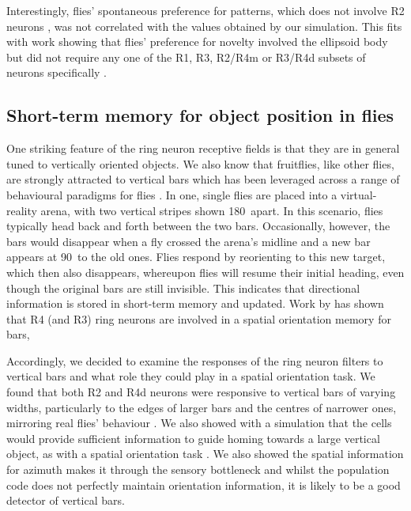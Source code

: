 Interestingly, flies' spontaneous preference for patterns, which does not involve R2 neurons \cite{Ernst1999}, was not correlated with the values obtained by our simulation. This fits with work showing that flies' preference for novelty involved the ellipsoid body but did not require any one of the R1, R3, R2/R4m or R3/R4d subsets of neurons specifically \cite{Solanki2015}.

\subsection{Short-term memory for object position in flies}

One striking feature of the ring neuron receptive fields is that they are in general tuned to vertically oriented objects.
We also know that fruitflies, like other flies, are strongly attracted to vertical bars which has been leveraged across a range of behavioural paradigms for flies \cite<bar fixation: >{Neuser2008}. In one, single flies are placed into a virtual-reality arena, with two vertical stripes shown 180\degree\ apart.
In this scenario, flies typically head back and forth between the two bars.
Occasionally, however, the bars would disappear when a fly crossed the arena's midline and a new bar appears at 90\degree\ to the old ones.
Flies respond by reorienting to this new target, which then also disappears, whereupon flies will resume their initial heading, even though the original bars are still invisible. This indicates that directional information is stored in short-term memory and updated. Work by  has shown that R4 (and R3) ring neurons are involved in a spatial orientation memory for bars, 

Accordingly, we decided to examine the responses of the ring neuron filters to vertical bars and what role they could play in a spatial orientation task.
We found that both R2 and R4d neurons were responsive to vertical bars of varying widths, particularly to the edges of larger bars and the centres of narrower ones, mirroring real flies' behaviour \cite{Osorio1990}.
We also showed with a simulation that the cells would provide sufficient information to guide homing towards a large vertical object, as with a spatial orientation task \cite{Neuser2008}.
We also showed the spatial information for azimuth makes it through the sensory bottleneck and whilst the population code does not perfectly maintain orientation information, it is likely to be a good detector of vertical bars.

